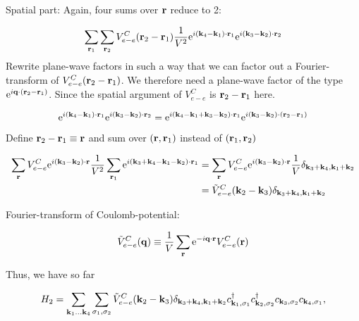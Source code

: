 \noindent Spatial part: Again, four sums over $\vb{r}$ reduce to 2: 

\begin{equation*}
	\sum_{\vb{r}_1} \sum_{\vb{r}_2} V_{e-e}^C (\vb{r}_2-\vb{r}_1) \frac{1}{V^2} \mathrm{e}^{i (\vb{k}_4-\vb{k}_1)\cdot \vb{r}_1} \mathrm{e}^{i (\vb{k}_3-\vb{k}_2)\cdot \vb{r}_2} 
\end{equation*}
\noindent Rewrite plane-wave factors in such a way that we can factor out a Fourier-transform of $V_{e-e}^C (\vb{r}_2-\vb{r}_1)$. We therefore need a plane-wave factor of the type $\mathrm{e}^{i \vb{q}\cdot (\vb{r}_2- \vb{r}_1)}$. Since the spatial argument of $V_{e-e}^C$ is $\vb{r}_2 -\vb{r}_1$ here.

\begin{equation*}
	\mathrm{e}^{i (\vb{k}_4-\vb{k}_1)\cdot \vb{r}_1} \mathrm{e}^{i (\vb{k}_3-\vb{k}_2)\cdot \vb{r}_2}  = \mathrm{e}^{i(\vb{k}_4-\vb{k}_1+ \vb{k}_3-\vb{k}_2)\cdot \vb{r}_1} \mathrm{e}^{i(\vb{k}_3- \vb{k}_2) \cdot (\vb{r}_2- \vb{r}_1)}
\end{equation*}

\noindent Define $\vb{r}_2 -\vb{r}_1 \equiv \vb{r}$ and sum over $(\vb{r}, \vb{r}_1)$ instead of $(\vb{r}_1, \vb{r}_2)$

\begin{align*}
	\sum_{\vb{r}} V_{e-e}^C \mathrm{e}^{i(\vb{k}_3-\vb{k}_2)\cdot \vb{r}} \frac{1}{V^2} \sum_{\vb{r}_1} \mathrm{e}^{i(\vb{k}_3+\vb{k}_4-\vb{k}_1-\vb{k}_2)\cdot \vb{r}_1} &=\sum_{\vb{r}} V_{e-e}^C \mathrm{e}^{i(\vb{k}_3-\vb{k}_2)\cdot \vb{r}}   \frac{1}{V} \delta_{\vb{k}_3+\vb{k}_4, \vb{k}_1+\vb{k}_2}\\
	&= \tilde{V}_{e-e}^C (\vb{k}_2-\vb{k}_3) \delta_{\vb{k}_3+\vb{k}_4, \vb{k}_1+\vb{k}_2}
\end{align*}

\noindent Fourier-transform of Coulomb-potential: 

\begin{align*}
	\tilde{V}_{e-e}^C (\vb{q})  \equiv \frac{1}{V} \sum_{\vb{r}} \mathrm{e}^{-i \vb{q} \cdot \vb{r} } V_{e-e}^C (\vb{r})
\end{align*}


\noindent Thus, we have so far

\begin{align*}
	H_2 = \sum_{\vb{k}_1...\vb{k}_4 } \sum_{\sigma_1, \sigma_2} \tilde{V}_{e-e}^C (\vb{k}_2- \vb{k}_3) \delta_{\vb{k}_3+\vb{k}_4, \vb{k}_1+\vb{k}_2} c^{\dagger}_{ \vb{k}_1, \sigma_1} c^{\dagger}_{ \vb{k}_2, \sigma_2}  c_{ \vb{k}_3, \sigma_2} c_{ \vb{k}_4, \sigma_1},
\end{align*}

